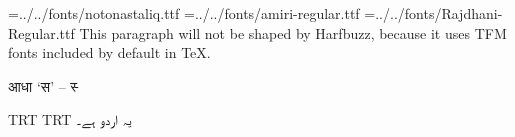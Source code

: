 
\pagewidth=210mm
\pageheight=297mm
\hsize=210mm
\hsize=190mm
\hoffset=10mm
\nopagenumbers
\parindent=0mm
\font\noto={../../fonts/notonastaliq.ttf}
\font\amiri={../../fonts/amiri-regular.ttf}
\font\raj={../../fonts/Rajdhani-Regular.ttf}
This paragraph will not be shaped by Harfbuzz, because it uses TFM fonts included by default in \TeX.

\raj
आधा ‘स’ – स्‍

\textdir TRT
\pardir TRT
\noto
یہ اردو ہے۔
\bye
